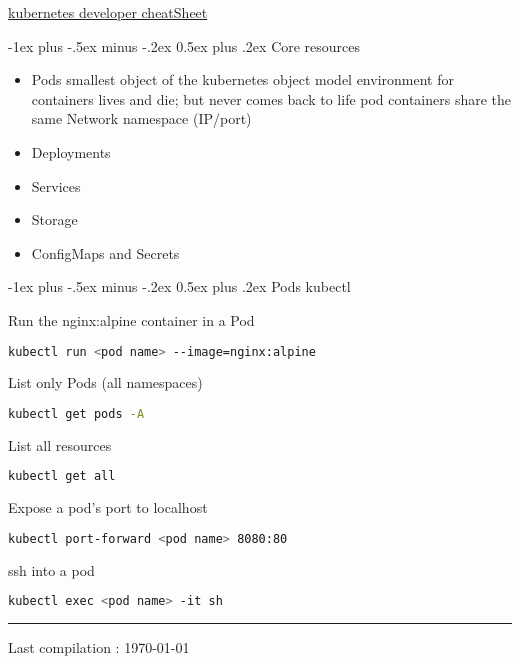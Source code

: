 \documentclass[11pt, landscape]{article}
\makeatletter
\renewcommand{\section}{\@startsection{section}{1}{0mm}%
{-1ex plus -.5ex minus -.2ex}%
{0.5ex plus .2ex}%
{\normalfont\large\bfseries}}
\makeatother
\begin{document}
\raggedright
\footnotesize
\begin{multicols}{2}

	\setlength{\premulticols}{1pt}
	\setlength{\postmulticols}{1pt}
	\setlength{\multicolsep}{1pt}
	\setlength{\columnsep}{2pt}

	\begin{center}
		\Large{\underline{kubernetes developer cheatSheet}} \\
	\end{center}

	\section {Core resources}
	\begin {itemize}
	\item Pods
	\subitem smallest object of the kubernetes object model
	\subitem environment for containers
	\subitem lives and die; but never comes back to life
	\subitem pod containers share the same Network namespace
	(IP/port)
	\item Deployments
	\item Services
	\item Storage
	\item ConfigMaps and Secrets
	\end {itemize}

	\section {Pods kubectl}

	\noindent Run the nginx:alpine container in a Pod
	\begin{lstlisting}[language=bash]
		kubectl run <pod name> --image=nginx:alpine
		\end{lstlisting}

	\noindent List only Pods (all namespaces)
	\begin{lstlisting}[language=bash]
		kubectl get pods -A
		\end{lstlisting}

	\noindent List all resources
	\begin{lstlisting}[language=bash]
			kubectl get all
		\end{lstlisting}
	
	\noindent Expose a pod's port to localhost
	\begin{lstlisting}[language=bash]
		kubectl port-forward <pod name> 8080:80
	\end{lstlisting}

	\noindent ssh into a pod
	\begin{lstlisting}[language=bash]
		kubectl exec <pod name> -it sh
	\end{lstlisting}

	\rule{0.3\linewidth}{0.25pt}
	\scriptsize

	Last compilation : \today
\end{multicols}
\end{document}
